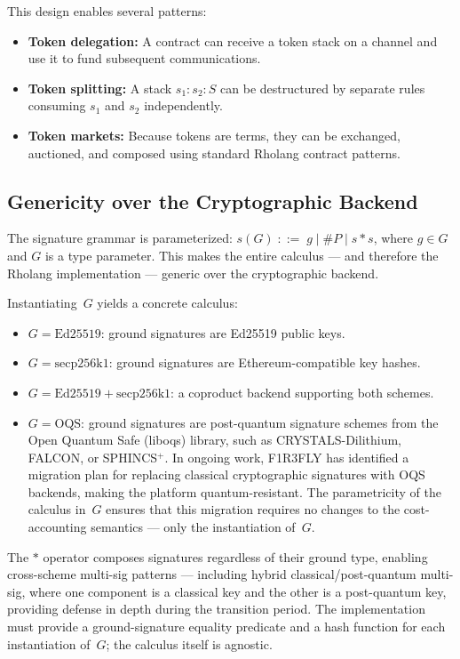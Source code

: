 \documentclass[11pt,a4paper]{article}
\newcommand{\comp}{\mathbin{*}}
\newcommand{\hashf}{\texttt{\#}}
\begin{document}
This design enables several patterns:

\begin{itemize}[nosep]
  \item \textbf{Token delegation:}  A contract can receive a
    token stack on a channel and use it to fund subsequent
    communications.
  \item \textbf{Token splitting:}  A stack $s_1 : s_2 : S$ can
    be destructured by separate rules consuming $s_1$ and $s_2$
    independently.
  \item \textbf{Token markets:}  Because tokens are terms, they
    can be exchanged, auctioned, and composed using standard
    Rholang contract patterns.
\end{itemize}

\subsection{Genericity over the Cryptographic Backend}
\label{sec:genericity}

The signature grammar is parameterized: $s(G) \;::=\; g \mid
\hashf P \mid s \comp s$, where $g \in G$ and $G$ is a type
parameter.  This makes the entire calculus --- and therefore
the Rholang implementation --- generic over the cryptographic
backend.

Instantiating~$G$ yields a concrete calculus:
\begin{itemize}[nosep]
  \item $G = \mathrm{Ed25519}$:  ground signatures are Ed25519
    public keys.
  \item $G = \mathrm{secp256k1}$:  ground signatures are
    Ethereum-compatible key hashes.
  \item $G = \mathrm{Ed25519} + \mathrm{secp256k1}$:  a
    coproduct backend supporting both schemes.
  \item $G = \mathrm{OQS}$:  ground signatures are
    post-quantum signature schemes from the Open Quantum Safe
    (liboqs) library, such as CRYSTALS-Dilithium, FALCON, or
    SPHINCS$^+$.  In ongoing work, F1R3FLY has identified a
    migration plan for replacing classical cryptographic
    signatures with OQS backends, making the platform
    quantum-resistant.  The parametricity of the calculus in~$G$
    ensures that this migration requires no changes to the
    cost-accounting semantics --- only the instantiation of~$G$.
\end{itemize}

\noindent
The $\comp$ operator composes signatures regardless of their
ground type, enabling cross-scheme multi-sig patterns ---
including hybrid classical/post-quantum multi-sig, where one
component is a classical key and the other is a post-quantum
key, providing defense in depth during the transition period.
The implementation must provide a ground-signature equality
predicate and a hash function for each instantiation of~$G$;
the calculus itself is agnostic.
\end{document}
